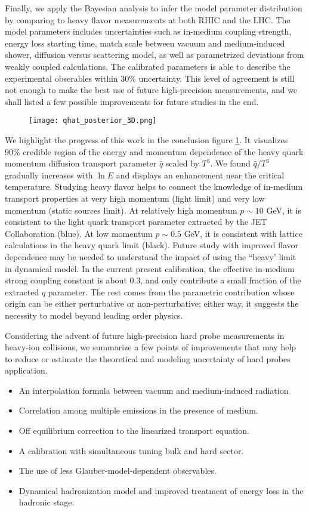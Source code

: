 Finally, we apply the Bayesian analysis to infer the model parameter distribution by comparing to heavy flavor measurements at both RHIC and the LHC.
The model parameters includes uncertainties such as in-medium coupling strength, energy loss starting time, match scale between vacuum and medium-induced shower, diffusion versus scattering model, as well as parametrized deviations from weakly coupled calculations.
The calibrated parameters is able to describe the experimental obserables within 30\% uncertainty.
This level of agreement is still not enough to make the best use of future high-precision measurements, and we shall listed a few possible improvements for future studies in the end.

\begin{figure}
\centering
\texttt{[image: qhat\_posterior\_3D.png]}
\caption{}
\label{fig:conlusion}
\end{figure}

We highlight the progress of this work in the conclusion figure \ref{fig:conlusion}.
It visualizes $90\%$ credible region of the energy and momentum dependence of the heavy quark momentum diffusion transport parameter $\hat{q}$ scaled by $T^3$.
We found $\hat{q}/T^3$ gradually increases with $\ln E$ and displays an enhancement near the critical temperature.
Studying heavy flavor helps to connect the knowledge of in-medium transport properties at very high momentum (light limit) and very low momentum (static sources limit).
At relatively high momentum $p\sim 10$ GeV, it is consistent to the light quark transport parameter extracted by the JET Collaboration (blue).
At low momentum $p\sim 0.5$ GeV, it is consistent with lattice calculations in the heavy quark limit (black).
Future study with improved flavor dependence may be needed to understand the impact of using the ``heavy' limit in dynamical model.
In the current present calibration, the effective in-medium strong coupling constant is about $0.3$, and only contribute a small fraction of the extracted $\hat{q}$ parameter.
The rest comes from the parametric contribution whose origin can be either perturbative or non-perturbative; either way, it suggests the necessity to model beyond leading order physics.

Considering the advent of future high-precision hard probe measurements in heavy-ion collisions,
we summarize a few points of improvements that may help to reduce or estimate the theoretical and modeling uncertainty of hard probes application.
\begin{itemize}
\item An interpolation formula between vacuum and medium-induced radiation
\item Correlation among multiple emissions in the presence of medium.
\item Off equilibrium correction to the linearized transport equation.
\item A calibration with simultaneous tuning bulk and hard sector.
\item The use of less Glauber-model-dependent observables.
\item Dynamical hadronization model and improved treatment of energy loss in the hadronic stage.
\end{itemize}